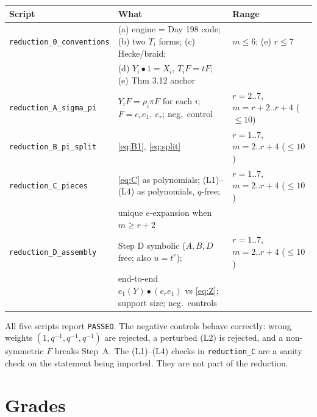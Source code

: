 \documentclass[11pt]{article}
\newcommand{\bul}{\bullet}
\theoremstyle{definition}
\begin{document}
\begin{center}\small
\begin{tabular}{@{}p{}p{}p{}@{}}\toprule
Script & What & Range\\\midrule
\texttt{reduction\_0\_\allowbreak conventions} & (a) engine = Day 198 code; (b) two $T_i$ forms; (c) Hecke/braid; & $m\le6$; (e) $r\le7$\\
 & (d) $Y_i\bul1=X_i$, $T_iF=tF$; (e) Thm 3.12 anchor & \\
\texttt{reduction\_A\_sigma\_pi} & $Y_iF=\rho_i\pi F$ for each $i$; $F=e_re_1,\ e_r$; neg.\ control & $r=2..7$, $m=r{+}2..r{+}4$ ($\le10$)\\
\texttt{reduction\_B\_pi\_split} & \eqref{eq:B1}, \eqref{eq:split} & $r=1..7$, $m=2..r{+}4$ ($\le10$)\\
\texttt{reduction\_C\_pieces} & \eqref{eq:C} as polynomials; (L1)--(L4) as polynomials, $q$-free; & $r=1..7$, $m=2..r{+}4$ ($\le10$)\\
 & unique $e$-expansion when $m\ge r+2$ & \\
\texttt{reduction\_D\_assembly} & Step D symbolic ($A,B,D$ free; also $u=t^r$); & $r=1..7$, $m=2..r{+}4$ ($\le10$)\\
 & end-to-end $e_1(Y)\bul(e_re_1)$ vs \eqref{eq:Z}; support size; neg.\ controls & \\\bottomrule
\end{tabular}
\end{center}
All five scripts report \texttt{PASSED}. The negative controls behave correctly: wrong weights
$(1,q^{-1},q^{-1},q^{-1})$ are rejected, a perturbed (L2) is rejected, and a non-symmetric $F$
breaks Step~A. The (L1)--(L4) checks in \texttt{reduction\_C} are a sanity check on the
statement being imported. They are not part of the reduction.

\section{Grades}
\end{document}
